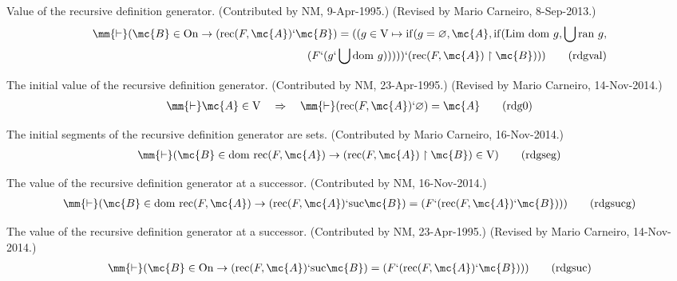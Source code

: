 \begin{lemma} Value of the recursive definition generator.
(Contributed by NM,
       9-Apr-1995.)  (Revised by Mario Carneiro, 8-Sep-2013.)
\begin{align}
\mm{\vdash} ( \mc{B} \in {\rm On} \rightarrow ( {\rm rec} ( F , \mc{A} ) `
    \mc{B} ) = ( ( g \in {\rm V} \mapsto {\rm if} ( g = \varnothing , \mc{A} ,
    {\rm if} ( {\rm Lim}~ {\rm dom}~ g , \bigcup {\rm ran}~ g , \\
     ( F ` ( g `
    \bigcup {\rm dom}~ g ) ) ) ) ) ` ( {\rm rec} ( F , \mc{A} ) \restriction
    \mc{B} ) ) )\label{eq:rdgval}\tag{rdgval}
\end{align}
\end{lemma}


\begin{lemma} The initial value of the recursive definition
generator.  (Contributed
         by NM, 23-Apr-1995.)  (Revised by Mario Carneiro, 14-Nov-2014.)
\begin{align}
\mm{\vdash} \mc{A} \in {\rm V}\quad\Rightarrow\quad \mm{\vdash} ( {\rm rec} ( F
    , \mc{A} ) ` \varnothing ) = \mc{A}\label{eq:rdg0}\tag{rdg0}
\end{align}
\end{lemma}


\begin{lemma} The initial segments of the recursive
definition generator are sets.
       (Contributed by Mario Carneiro, 16-Nov-2014.)
\begin{align}
\mm{\vdash} ( \mc{B} \in {\rm dom}~ {\rm rec} ( F , \mc{A} ) \rightarrow ( {\rm
    rec} ( F , \mc{A} ) \restriction \mc{B} ) \in {\rm V}
    )\label{eq:rdgseg}\tag{rdgseg}
\end{align}
\end{lemma}


\begin{lemma} The value of the recursive definition
generator at a successor.
       (Contributed by NM, 16-Nov-2014.)
\begin{align}
\mm{\vdash} ( \mc{B} \in {\rm dom}~ {\rm rec} ( F , \mc{A} ) \rightarrow ( {\rm
    rec} ( F , \mc{A} ) ` {\rm suc} \mc{B} ) = ( F ` ( {\rm rec} ( F , \mc{A} )
    ` \mc{B} ) ) )\label{eq:rdgsucg}\tag{rdgsucg}
\end{align}
\end{lemma}


\begin{lemma} The value of the recursive definition
generator at a successor.
       (Contributed by NM, 23-Apr-1995.)  (Revised by Mario Carneiro,
       14-Nov-2014.)
\begin{align}
\mm{\vdash} ( \mc{B} \in {\rm On} \rightarrow ( {\rm rec} ( F , \mc{A} ) ` {\rm
    suc} \mc{B} ) = ( F ` ( {\rm rec} ( F , \mc{A} ) ` \mc{B} ) )
    )\label{eq:rdgsuc}\tag{rdgsuc}
\end{align}
\end{lemma}


